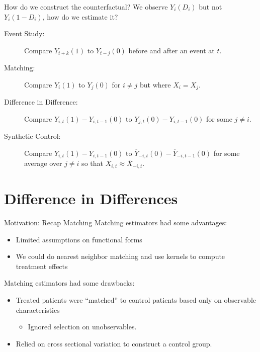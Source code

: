 \documentclass[aspectratio=169,11pt]{beamer}
\begin{document}
\begin{frame}{How do we construct the counterfactual?}
We observe $Y_i(D_i)$ but not $Y_i(1-D_i)$, how do we estimate it?\\

\begin{description}
  \item [Event Study:] Compare $Y_{t+k}(1)$ to $Y_{t-j}(0)$ before and after an event at $t$.
  \item [Matching:] Compare $Y_i(1)$ to $Y_j(0)$ for $i \neq j$ but where $X_i = X_j$.
  \item [\alert{Difference in Difference:}] Compare $Y_{i,t}(1)-Y_{i,t-1}(0)$ to $Y_{j,t}(0)-Y_{i,t-1}(0)$  for some $j \neq i$.
  \item [Synthetic Control:] Compare $Y_{i,t}(1)-Y_{i,t-1}(0)$ to $\overline{Y}_{-i,t}(0)-\overline{Y}_{-i,t-1}(0)$ for some average over $j \neq i$ so that $X_{i,t} \approx \overline{X}_{-i,t}$.

\end{description}
\end{frame}


\section{Difference in Differences}

\begin{frame}{Motivation: Recap Matching}
Matching estimators had some advantages:
\begin{itemize}
\item Limited assumptions on \alert{functional forms}
\item We could do nearest neighbor matching and use kernels to compute treatment effects
\end{itemize}
Matching estimators had some drawbacks:
\begin{itemize}
\item Treated patients were ``matched'' to control patients based only on \alert{observable characteristics}
\begin{itemize}
\item Ignored \alert{selection on unobservables}.
\end{itemize}
\item Relied on \alert{cross sectional} variation to construct a control group.
\end{itemize}
\end{frame}
\end{document}
